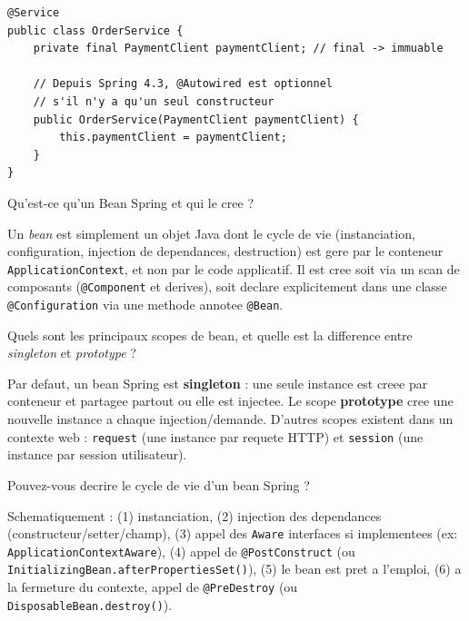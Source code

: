 \documentclass[11pt,a4paper]{article}
\begin{document}
\begin{lstlisting}
@Service
public class OrderService {
    private final PaymentClient paymentClient; // final -> immuable

    // Depuis Spring 4.3, @Autowired est optionnel
    // s'il n'y a qu'un seul constructeur
    public OrderService(PaymentClient paymentClient) {
        this.paymentClient = paymentClient;
    }
}
\end{lstlisting}

\begin{question} Qu'est-ce qu'un Bean Spring et qui le cree ?
\end{question}
\begin{reponse}
Un \emph{bean} est simplement un objet Java dont le cycle de vie (instanciation, configuration, injection de dependances, destruction) est gere par le conteneur \texttt{ApplicationContext}, et non par le code applicatif. Il est cree soit via un scan de composants (\texttt{@Component} et derives), soit declare explicitement dans une classe \texttt{@Configuration} via une methode annotee \texttt{@Bean}.
\end{reponse}

\begin{question} Quels sont les principaux scopes de bean, et quelle est la difference entre \emph{singleton} et \emph{prototype} ?
\end{question}
\begin{reponse}
Par defaut, un bean Spring est \textbf{singleton} : une seule instance est creee par conteneur et partagee partout ou elle est injectee. Le scope \textbf{prototype} cree une nouvelle instance a chaque injection/demande. D'autres scopes existent dans un contexte web : \texttt{request} (une instance par requete HTTP) et \texttt{session} (une instance par session utilisateur).
\end{reponse}

\begin{question} Pouvez-vous decrire le cycle de vie d'un bean Spring ?
\end{question}
\begin{reponse}
Schematiquement : (1) instanciation, (2) injection des dependances (constructeur/setter/champ), (3) appel des \texttt{Aware} interfaces si implementees (ex: \texttt{ApplicationContextAware}), (4) appel de \texttt{@PostConstruct} (ou \texttt{InitializingBean.afterPropertiesSet()}), (5) le bean est pret a l'emploi, (6) a la fermeture du contexte, appel de \texttt{@PreDestroy} (ou \texttt{DisposableBean.destroy()}).
\end{reponse}
\end{document}
